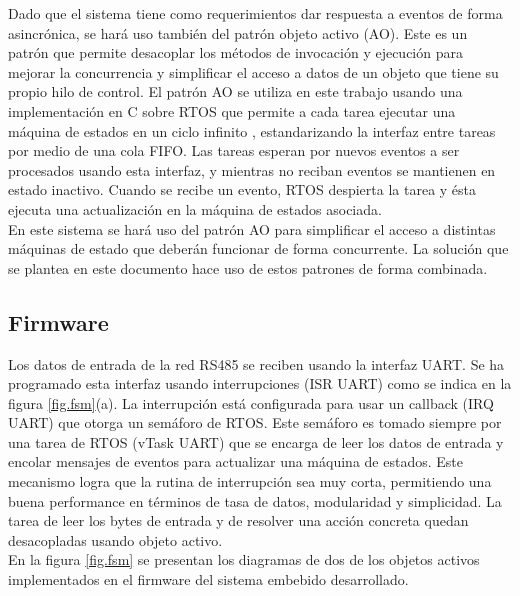 \documentclass[conference]{IEEEtran}
\begin{document}
Dado que el sistema tiene como requerimientos dar respuesta a eventos de forma asincrónica, se hará uso también del patrón objeto activo (AO)\cite{b11}. Este es un patrón que permite desacoplar los métodos de invocación y ejecución para mejorar la concurrencia y simplificar el acceso a datos de un objeto que tiene su propio hilo de control. El patrón AO se utiliza en este trabajo usando una implementación en C sobre RTOS que permite a cada tarea ejecutar una máquina de estados en un ciclo infinito  \cite{b12}, estandarizando la interfaz entre tareas por medio de una cola FIFO. Las tareas esperan por nuevos eventos a ser procesados usando esta interfaz, y mientras no reciban eventos se mantienen en estado inactivo. Cuando se recibe un evento, RTOS despierta la tarea y ésta ejecuta una actualización en la máquina de estados asociada. \\

En este sistema se hará uso del patrón AO para simplificar el acceso a distintas máquinas de estado que deberán funcionar de forma concurrente. La solución que se plantea en este documento hace uso de estos patrones de forma combinada.\\


\subsection{Firmware}



Los datos de entrada de la red RS485 se reciben usando la interfaz UART. Se ha programado esta interfaz usando interrupciones (ISR UART) como se indica en la figura \ref{fig.fsm}(a). La interrupción está configurada para usar un callback (IRQ UART) que otorga un semáforo de RTOS. Este semáforo es tomado siempre por una tarea de RTOS (vTask UART) que se encarga de leer los datos de entrada y encolar mensajes de eventos para actualizar una máquina de estados. Este mecanismo logra que la rutina de interrupción sea muy corta, permitiendo una buena performance en términos de tasa de datos, modularidad y simplicidad. La tarea de leer los bytes de entrada y de resolver una acción concreta quedan desacopladas usando objeto activo.\\

 En la figura \ref{fig.fsm} se presentan los diagramas de dos de los objetos activos implementados en el firmware del sistema embebido desarrollado.\\
\end{document}
